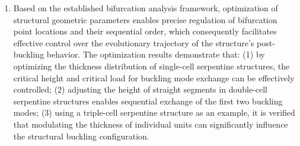 \begin{abstract*}
\begin{enumerate}
	\item Based on the established bifurcation analysis framework, optimization of structural geometric parameters enables precise regulation of bifurcation point locations and their sequential order, which consequently facilitates effective control over the evolutionary trajectory of the structure's post-buckling behavior. The optimization results demonstrate that: (1) by optimizing the thickness distribution of single-cell serpentine structures, the critical height and critical load for buckling mode exchange can be effectively controlled; (2) adjusting the height of straight segments in double-cell serpentine structures enables sequential exchange of the first two buckling modes; (3) using a triple-cell serpentine structure as an example, it is verified that modulating the thickness of individual units can significantly influence the structural buckling configuration.
\end{enumerate}



\end{abstract*}

